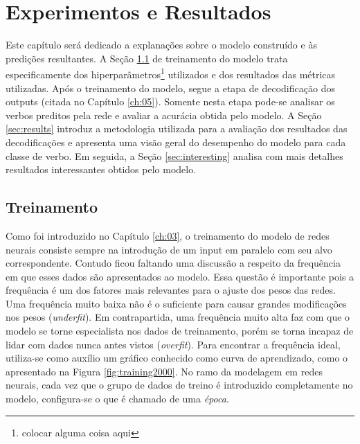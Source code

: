 \chapter{Experimentos e Resultados}
\label{ch:07}

Este capítulo será dedicado a explanações sobre o modelo construído e às predições resultantes. A Seção \ref{sec:treinamento} de treinamento do modelo trata especificamente dos hiperparâmetros\footnote{colocar alguma coisa aqui} utilizados e dos resultados das métricas utilizadas. Após o treinamento do modelo, segue a etapa de decodificação dos outputs (citada no Capítulo \ref{ch:05}). Somente nesta etapa pode-se analisar os verbos preditos pela rede e avaliar a acurácia obtida pelo modelo. A Seção \ref{sec:results} introduz a metodologia utilizada para a avaliação dos resultados das decodificações e apresenta uma visão geral do desempenho do modelo para cada classe de verbo. Em seguida, a Seção \ref{sec:interesting} analisa com mais detalhes resultados interessantes obtidos pelo modelo. 

\section{Treinamento}
\label{sec:treinamento}

Como foi introduzido no Capítulo \ref{ch:03}, o treinamento do modelo de redes neurais consiste sempre na introdução de um input em paralelo com seu alvo correspondente. Contudo ficou faltando uma discussão a respeito da frequência em que esses dados são apresentados ao modelo. Essa questão é importante pois a frequência é um dos fatores mais relevantes para o ajuste dos pesos das redes. Uma frequência muito baixa não é o suficiente para causar grandes modificações nos pesos (\textit{underfit}). Em contrapartida, uma frequência muito alta faz com que o modelo se torne especialista nos dados de treinamento, porém se torna incapaz de lidar com dados nunca antes vistos (\textit{overfit}). Para encontrar a frequência ideal, utiliza-se como auxílio um gráfico conhecido como curva de aprendizado, como o apresentado na Figura \ref{fig:training2000}. No ramo da modelagem em redes neurais, cada vez que o grupo de dados de treino é introduzido completamente no modelo, configura-se o que é chamado de uma \textit{época}. 

